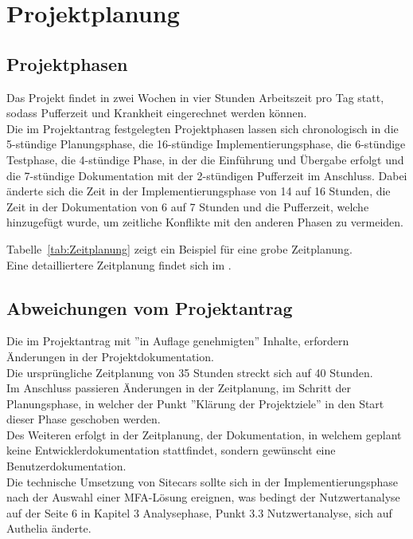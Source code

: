 \section{Projektplanung} 
\label{sec:Projektplanung}


\subsection{Projektphasen}
\label{sec:Projektphasen}

Das Projekt findet in zwei Wochen in vier Stunden Arbeitszeit pro Tag statt, sodass Pufferzeit und 
Krankheit eingerechnet werden können.
\\Die im Projektantrag festgelegten Projektphasen lassen sich chronologisch in die 5-stündige Planungsphase, 
die 16-stündige Implementierungsphase, die 6-stündige Testphase, die 4-stündige Phase, in der die 
Einführung und Übergabe erfolgt und die 7-stündige Dokumentation mit der 2-stündigen Pufferzeit im Anschluss.
Dabei änderte sich die Zeit in der Implementierungsphase von 14 auf 16 Stunden, die Zeit in der 
Dokumentation von 6 auf 7 Stunden und die Pufferzeit, welche hinzugefügt wurde, um zeitliche Konflikte mit 
den anderen Phasen zu vermeiden.

Tabelle~\ref{tab:Zeitplanung} zeigt ein Beispiel für eine grobe Zeitplanung.
\\
Eine detailliertere Zeitplanung findet sich im .


\subsection{Abweichungen vom Projektantrag}
\label{sec:AbweichungenProjektantrag}

Die im Projektantrag mit ''in Auflage genehmigten'' Inhalte, erfordern Änderungen in der Projektdokumentation.
\\Die ursprüngliche Zeitplanung von 35 Stunden streckt sich auf 40 Stunden.
\\Im Anschluss passieren Änderungen in der Zeitplanung, im Schritt der Planungsphase, in welcher der Punkt ''Klärung der 
Projektziele'' in den Start dieser Phase geschoben werden.
\\Des Weiteren erfolgt in der Zeitplanung, der Dokumentation, in welchem geplant keine Entwicklerdokumentation 
stattfindet, sondern gewünscht eine Benutzerdokumentation.
\\Die technische Umsetzung von Sitecars sollte sich in der Implementierungsphase nach der Auswahl einer MFA-Lösung 
ereignen, was bedingt der Nutzwertanalyse auf der Seite 6 in Kapitel 3 Analysephase, Punkt 3.3 Nutzwertanalyse, 
sich auf Authelia änderte.


